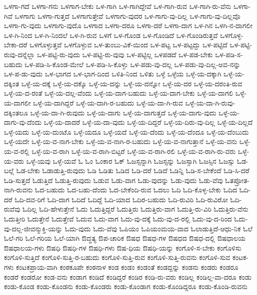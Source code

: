 {ಒಳಗಾ-ಗದೆ
ಒಳಗಾ-ಗನು
ಒಳಗಾಗ-ಬೇಕು
ಒಳ-ಗಾಗಿ
ಒಳ-ಗಾಗಿದ್ದೇವೆ
ಒಳ-ಗಾಗಿ-ರುವ
ಒಳ-ಗಾಗಿ-ರು-ವೆನು
ಒಳಗಾ-ಗಿವೆ
ಒಳಗಾಗು
ಒಳಗಾ-ಗುತ್ತದೆ
ಒಳಗಾಗುತ್ತೇವೆ
ಒಳಗಾಗು-ವುದರ
ಒಳ-ಗಾಗು-ವು-ದಿಲ್ಲ
ಒಳ-ಗಾಗು-ವು-ದಿಲ್ಲವೊ
ಒಳಗಾ-ಗು-ವುದು
ಒಳಗಾಗು-ವುದೊ
ಒಳಗಾದ
ಒಳಗಾ-ದರೂ
ಒಳಗಾ-ದರೆ
ಒಳಗಾ-ದಾಗ
ಒಳ-ಗಿನ
ಒಳಗಿ-ನ-ದಾಗಲೀ
ಒಳ-ಗಿ-ನಿಂದ
ಒಳ-ಗಿ-ನಿಂದಲೆ
ಒಳ-ಗಿ-ರುವ
ಒಳಗೆ
ಒಳ-ಗೊಂಡ
ಒಳ-ಗೊಂಡಿದೆ
ಒಳ-ಗೊಂಡಿರುತ್ತವೆ
ಒಳಗೊಳ್ಳ-ಬೇಕಾ-ದರೆ
ಒಳಗೊಳ್ಳುತ್ತವೆ
ಒಳಗೊಳ್ಳುವ
ಒಳ-ತುಂಬು-ವಿಕೆ-ಯಿಂದ
ಒಳ-ಪಟ್ಟ
ಒಳ-ಪಟ್ಟದ್ದು
ಒಳ-ಪಟ್ಟಿದೆ
ಒಳ-ಪಟ್ಟಿ-ರುವು-ದನ್ನೆಲ್ಲಾ
ಒಳ-ಪಟ್ಟಿ-ರು-ವುದು
ಒಳ-ಪಟ್ಟಿ-ರು-ವುವು
ಒಳ-ಪಟ್ಟಿಲ್ಲ
ಒಳಪಡದೆ
ಒಳ-ಪಡ-ಬೇಕು
ಒಳ-ಪಡಿ-ಸ-ಬಹುದು
ಒಳ-ಪಡಿ-ಸಿ-ಕೊಂಡ-ಮೇಲೆ
ಒಳ-ಪಡಿ-ಸಿ-ಕೊಳ್ಳು
ಒಳ-ಪಡು-ವು-ದಲ್ಲ
ಒಳ-ಪಡು-ವು-ದಿಲ್ಲ-ಅವ-ನನ್ನು
ಒಳ-ಪ-ಡು-ವುದು
ಒಳ-ಭಾಗದ
ಒಳ-ಭಾಗ-ದಿಂದ
ಒಳಿತಿ-ನಿಂದ
ಒಳಿತು
ಒಳ್ಳೆ
ಒಳ್ಳೆಯ
ಒಳ್ಳೆ-ಯ-ದಕ್ಕಾಗಿ
ಒಳ್ಳೆ-ಯ-ದಕ್ಕಿಂತ
ಒಳ್ಳೆ-ಯ-ದಕ್ಕೆ
ಒಳ್ಳೆ-ಯ-ದಕ್ಕೊ
ಒಳ್ಳೆ-ಯ-ದನ್ನು
ಒಳ್ಳೆ-ಯ-ದನ್ನೋ
ಒಳ್ಳೆ-ಯ-ದರ
ಒಳ್ಳೆ-ಯ-ದರಂತಿ-ರುವ
ಒಳ್ಳೆ-ಯ-ದ-ರಂತೆ
ಒಳ್ಳೆ-ಯ-ದಲ್ಲ-ವೆಂದು
ಒಳ್ಳೆ-ಯ-ದಾಗ-ಬಹುದು
ಒಳ್ಳೆ-ಯ-ದಾಗ-ಬೇಕು
ಒಳ್ಳೆ-ಯ-ದಾಗಲಿ
ಒಳ್ಳೆ-ಯ-ದಾಗಲೀ
ಒಳ್ಳೆ-ಯ-ದಾಗಿದ್ದರೆ
ಒಳ್ಳೆ-ಯ-ದಾಗಿ-ರ-ಬಹುದು
ಒಳ್ಳೆ-ಯ-ದಾ-ಗಿ-ರುವ
ಒಳ್ಳೆ-ಯ-ದಾ-ಗಿ-ರುವು-ದಕ್ಕಿಂತಲೂ
ಒಳ್ಳೆ-ಯ-ದಾ-ಗಿ-ರುವುದು
ಒಳ್ಳೆ-ಯ-ದಾಗು
ಒಳ್ಳೆ-ಯ-ದಾಗುತ್ತದೆ
ಒಳ್ಳೆ-ಯ-ದಾಗು-ವುದು
ಒಳ್ಳೆ-ಯ-ದಾಗು-ವು-ದೆಂದು
ಒಳ್ಳೆ-ಯ-ದಾದರೆ
ಒಳ್ಳೆ-ಯ-ದಾ-ವುದು
ಒಳ್ಳೆ-ಯ-ದಿದ್ದರೆ
ಒಳ್ಳೆ-ಯ-ದಿರು-ವು-ದಿಲ್ಲ
ಒಳ್ಳೆ-ಯ-ದಿಲ್ಲದೆ
ಒಳ್ಳೆ-ಯದು
ಒಳ್ಳೆ-ಯ-ದುಂಟೊ
ಒಳ್ಳೆ-ಯದೂ
ಒಳ್ಳೆ-ಯದೆ
ಒಳ್ಳೆ-ಯ-ದೆಂದು
ಒಳ್ಳೆ-ಯ-ದೆಂದೂ
ಒಳ್ಳೆ-ಯ-ದೆಂಬುದು
ಒಳ್ಳೆ-ಯದೇ
ಒಳ್ಳೆ-ಯ-ವ-ನಾಗ-ಬೇಕು
ಒಳ್ಳೆ-ಯ-ವ-ನಾಗಿ-ರ-ಬಹುದು
ಒಳ್ಳೆ-ಯ-ವ-ನಾಗುತ್ತಾನೆ
ಒಳ್ಳೆ-ಯ-ವನು
ಒಳ್ಳೆ-ಯ-ವ-ರಲ್ಲಿ
ಒಳ್ಳೆ-ಯ-ವ-ರಾಗಿ
ಒಳ್ಳೆ-ಯ-ವ-ರಾಗಿ-ಬಿಟ್ಟರೆ
ಒಳ್ಳೆ-ಯ-ವ-ರಾಗಿ-ರಲಿ
ಒಳ್ಳೆ-ಯ-ವ-ರಾಗಿ-ರು-ವರು
ಒಳ್ಳೆ-ಯ-ವರು
ಒಳ್ಳೆ-ಯವು
ಒಳ್ಳೆ-ಯವೆ
ಓ
ಓಂ
ಓಂಕಾರ
ಓಕ್
ಓಜಸ್ಸನ್ನಾಗಿ
ಓಜಸ್ಸನ್ನು
ಓಜಸ್ಸಾಗಿ
ಓಜಸ್ಸಿನ
ಓಜಸ್ಸು
ಓಡ-ಬಲ್ಲೆ
ಓಡ-ಬೇಕು
ಓಡಾಡುತ್ತಿ-ರುವುದು
ಓಡಿ
ಓಡಿತು
ಓಡಿದ
ಓಡಿ-ದರೆ
ಓಡಿದೆ
ಓಡಿನ್ನಿ
ಓಡಿ-ಸ-ಬೇಕೆಂದೆ
ಓಡಿ-ಸಿ-ದರೆ
ಓಡಿ-ಸುತ್ತದೆ
ಓಡುತ್ತಿದೆ
ಓಡುತ್ತಿ-ರುವುದು
ಓಡುವ
ಓಡು-ವಾಗ
ಓಡು-ವುದನ್ನು
ಓಡು-ವುದು
ಓಡು-ವೆವು
ಓತಪ್ರೋತ-ನಾಗಿ-ರುವನು
ಓದ-ಬಹುದು
ಓದ-ಬಹು-ದೆಂದು
ಓದ-ಬೇಕೆಂದಿ-ರುವ
ಓದಲು
ಓದಿ
ಓದಿ-ಕೊಳ್ಳ-ಬೇಕು
ಓದಿದ
ಓದಿ-ದರೆ
ಓದಿ-ದವ-ರಿಗೆ
ಓದಿ-ದಾಗ
ಓದಿದೆ
ಓದಿದ್ದೆ
ಓದಿ-ಯಾದ
ಓದಿರ-ಬಹುದು
ಓದಿ-ರುವಿರಿ
ಓದಿ-ರುವಿರೋ
ಓದಿ-ರುವೆವು
ಓದಿಲ್ಲ
ಓದಿ-ಹೇಳುತ್ತೇನೆ
ಓದು
ಓದುತ್ತಿದ್ದರೆ
ಓದುತ್ತಿರು
ಓದುತ್ತಿರು-ವಾಗ
ಓದುತ್ತಿ-ರು-ವಿರಿ
ಓದುತ್ತಿರು-ವೆನು
ಓದುತ್ತೀರಿ
ಓದುತ್ತೇನೆ
ಓದುತ್ತೇವೆ
ಓದುವ
ಓದು-ವಾಗ
ಓದು-ವು-ದಕ್ಕೆ
ಓದು-ವು-ದ-ರಲ್ಲಿ
ಓದು-ವು-ದ-ರಿಂದ
ಓದು-ವು-ದಲ್ಲ-ಜೀವನ್ಮುಕ್ತಿ-ಯನ್ನು
ಓದು-ವುದು
ಓದು-ವೆವು
ಓಪಿಯಂ
ಓಪಿಯಂಮಯ-ವಾದ
ಓಲಾಡುತ್ತಿದೆ-ಆಧು-ನಿಕ
ಓಲೆ
ಓಲೆ-ಗರಿ
ಓಲೆ-ಗರಿಯ
ಓಲೆ-ಯಾಗಿ
ಔದ್ಧತ್ಯ
ಔಪ-ಚಾರಿಕ
ಔಷಧ
ಔಷಧ-ಗಳ
ಔಷಧದ
ಔಷಧ-ದಲ್ಲಿ
ಔಷಧಾಲಯ
ಔಷಧಾಲಯ-ಗಳು
ಔಷಧಿ
ಔಷಧಿ-ಗಳ
ಔಷಧಿ-ಗಳು
ಔಷ-ಧಿಯ
ಔಷಧಿ-ಯನ್ನು
ಕಂಗೊಳಿ-ಸ-ಬೇಕು
ಕಂಗೊಳಿಸು
ಕಂಗೊಳಿ-ಸುತ್ತಿದೆ
ಕಂಗೊಳಿ-ಸುತ್ತಿ-ರ-ಬಹುದು
ಕಂಗೊಳಿ-ಸುತ್ತಿ-ರುವ
ಕಂಗೊಳಿ-ಸುತ್ತಿ-ರುವನು
ಕಂಗೊಳಿ-ಸುವ
ಕಂಟಕ-ಗಳು
ಕಂಟಕಪ್ರಾಯ-ವಾಗಿ
ಕಂಠಕೂಪೇ
ಕಂಠನಾಳ
ಕಂಡ
ಕಂಡಂ
ಕಂಡಂತೆ
ಕಂಡದ್ದನ್ನು
ಕಂಡನು
ಕಂಡರು
ಕಂಡರೂ
ಕಂಡರೆ
ಕಂಡರೋ
ಕಂಡ-ವನು
ಕಂಡಾಗ
ಕಂಡಿದೆ
ಕಂಡಿದ್ದರೆ
ಕಂಡಿರ
ಕಂಡಿ-ರು-ವರು
ಕಂಡಿಲ್ಲ
ಕಂಡಿಲ್ಲ-ವಾ-ದರೂ
ಕಂಡು
ಕಂಡು-ಕೊಂಡ
ಕಂಡು-ಕೊಂಡನು
ಕಂಡು-ಕೊಂಡರು
ಕಂಡು-ಕೊಂಡಾಗ
ಕಂಡು-ಕೊಂಡಿದ್ದರೂ
ಕಂಡು-ಕೊಂಡಿ-ರುವನು
}
